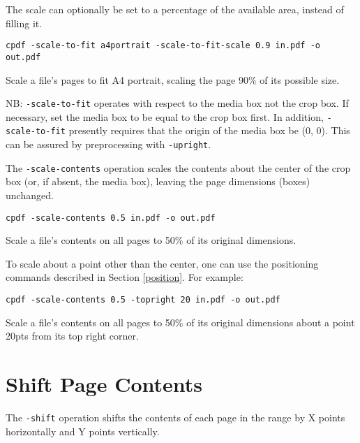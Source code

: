 \documentclass{book}
\begin{document}
  \noindent The scale can optionally be set to a percentage of the available area, instead of filling it.
  \begin{framed}
  \small\noindent\verb!cpdf -scale-to-fit a4portrait -scale-to-fit-scale 0.9 in.pdf -o out.pdf!


  \vspace{2.5mm}
  \noindent Scale a file's pages to fit A4 portrait, scaling the page 90\% of its possible size.
  \end{framed}

\noindent NB: \texttt{-scale-to-fit} operates with respect to the media box not the crop box. If necessary, set the media box to be equal to the crop box first. In addition, \texttt{-scale-to-fit} presently requires that the origin of the media box be (0, 0). This can be assured by preprocessing with \texttt{-upright}.

The \texttt{-scale-contents} operation scales the contents about the center
  of the crop box (or, if absent, the media box), leaving the page dimensions
  (boxes) unchanged.

  \begin{framed}
  \small\noindent\verb!cpdf -scale-contents 0.5 in.pdf -o out.pdf!

  \vspace{2.5mm}
  \noindent Scale a file's contents on all pages to 50\% of its original dimensions.
  \end{framed}

  \noindent To scale about a point other than the center, one can use the positioning commands described in Section \ref{position}. For example:
  
  \begin{framed}
  \small\noindent\verb!cpdf -scale-contents 0.5 -topright 20 in.pdf -o out.pdf!

  \vspace{2.5mm}
  \noindent Scale a file's contents on all pages to 50\% of its original dimensions about a point 20pts from its top right corner.
  \end{framed}

  

  \section{Shift Page Contents}

  The \texttt{-shift} operation shifts the contents of each page in the range
by X points horizontally and Y points vertically.
\end{document}
